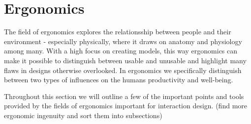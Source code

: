\section{Ergonomics} \label{sec:ergonomics} 
The field of ergonomics explores the relationsship between people and their environment - especially physically, where it draws on anatomy and physiology among many.  With a high focus on creating models, this way ergonomics can make it possible to distinguish between usable and unusable and highlight many flaws in designs otherwise overlooked. In ergonomics we specifically distinguish between two types of influences on the humans productivity and well-being.




Throughout this section we will outline a few of the important points and tools provided by the fields of ergonomics important for interaction design. (\todo find more ergonomic ingenuity and sort them into subsections)



